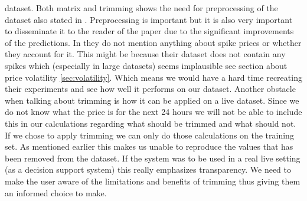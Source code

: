 dataset. Both matrix and trimming shows the need for preprocessing of the dataset also stated in \cite{yamin2004adaptive}. Preprocessing is important but it is also very important to disseminate it to the reader of the paper due to the significant improvements of the predictions. In \cite{sansom1999neural, 1} they do not mention anything about spike prices or whether they account for it. This might be because their dataset does not contain any spikes which (especially in large datasets) seems implausible see section about price volatility \ref{sec:volatility}. Which means we would have a hard time recreating their experiments and see how well it performs on our dataset. Another obstacle when talking about trimming is how it can be applied on a live dataset. Since we do not know what the price is for the next 24 hours we will not be able to include this in our calculations regarding what should be trimmed and what should not. If we chose to apply trimming we can only do those calculations on the training set. As mentioned earlier this makes us unable to reproduce the values that has been removed from the dataset. If the system was to be used in a real live setting (as a decision support system) this really emphasizes transparency. We need to make the user aware of the limitations and benefits of trimming thus giving them an informed choice to make.